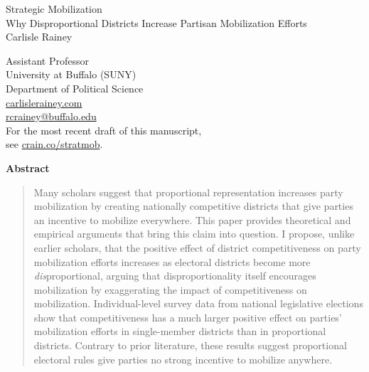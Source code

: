 \documentclass[12pt]{article}
\begin{document}
\begin{center}
{\LARGE Strategic Mobilization}\\\vspace{2mm}
{\large Why Disproportional Districts Increase Partisan Mobilization Efforts}\\
\vspace{3mm}
Carlisle Rainey\\\singlespace
\begin{small}
Assistant Professor\\
University at Buffalo (SUNY)\\
Department of Political Science\\
\href{http://www.carlislerainey.com}{carlislerainey.com}\\
\href{mailto:rcrainey@buffalo.edu}{rcrainey@buffalo.edu}\\\vspace{4mm}
For the most recent draft of this manuscript,\\see \href{http://www.carlislerainey.com/research/strategic-mobilization}{crain.co/stratmob}.
\end{small}
\end{center}


{\centerline{\textbf{Abstract}}}
\begin{quote}\noindent Many scholars suggest that proportional representation increases party mobilization by creating nationally competitive districts that give parties an incentive to mobilize everywhere. This paper provides theoretical and empirical arguments that bring this claim into question. I propose, unlike earlier scholars, that the positive effect of district competitiveness on party mobilization efforts increases as electoral districts become more \textit{dis}proportional, arguing that disproportionality itself encourages mobilization by exaggerating the impact of competitiveness on mobilization. Individual-level survey data from national legislative elections show that competitiveness has a much larger positive effect on parties' mobilization efforts in single-member districts than in proportional districts. Contrary to prior literature, these results suggest proportional electoral rules give parties no strong incentive to mobilize anywhere.\end{quote}
\thispagestyle{empty}
\end{document}
